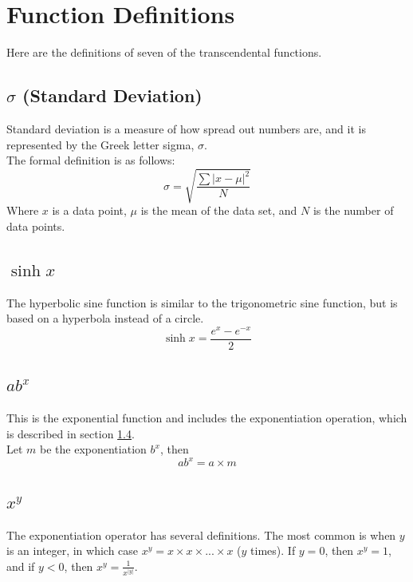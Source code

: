 \documentclass[11pt,onside]{report}
\begin{document}
\section{Function Definitions}
Here are the definitions of seven of the transcendental functions.

\subsection{$\sigma$ (Standard Deviation)}
    Standard deviation is a measure of how spread out numbers are, and it is represented by the Greek letter sigma, $\sigma$. \\
    The formal definition is as follows:
\begin{equation}
    \sigma = \sqrt{\frac{\sum |x-\mu|^2}{N}}
\end{equation}
Where $x$ is a data point, $\mu$ is the mean of the data set, and $N$ is the number of data points. \cite{standard_deviation}

\subsection{$\sinh{x}$}
The hyperbolic sine function is similar to the trigonometric sine function, but is based on a hyperbola instead of a circle. \cite{sinh}
\begin{equation}
    \sinh{x} = \frac{e^x-e^{-x}}{2}
\end{equation}

\subsection{$ab^x$}
This is the exponential function and includes the exponentiation operation, which is described in section \ref{exponential}. \\
Let $m$ be the exponentiation $b^x$, then
\begin{equation}
    ab^x = a\times m
\end{equation}

\subsection{$x^y$} \label{exponential}
The exponentiation operator has several definitions. The most common is when $y$ is an integer, in which case $x^y = x \times x \times ... \times x$ ($y$ times). If $y = 0$, then $x^y = 1$, and if $y < 0$, then $x^y = \frac{1}{x^{|y|}}$. \cite{exponents}\\
\end{document}
